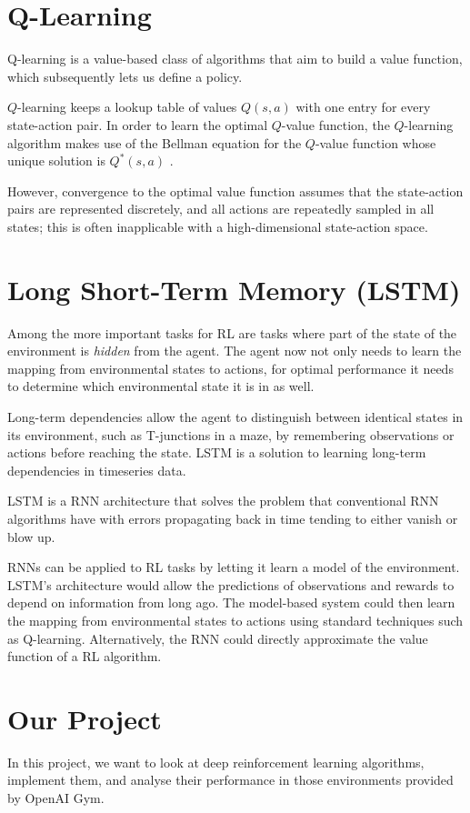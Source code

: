 \documentclass{article}
\begin{document}
\section{Q-Learning}
Q-learning is a value-based class of algorithms that aim to build a value function, which subsequently lets us define a policy.

$Q$-learning keeps a lookup table of values $Q(s,a)$ with one entry for every state-action pair. In order to learn the optimal $Q$-value function, the $Q$-learning algorithm makes use of the Bellman equation for the $Q$-value function whose unique solution is $Q^*(s,a)$ \cite{DBLP:journals/corr/abs-1811-12560}.

However, convergence to the optimal value function assumes that the state-action pairs are represented discretely, and all actions are repeatedly sampled in all states; this is often inapplicable with a high-dimensional state-action space.

\section{Long Short-Term Memory (LSTM) \cite{10.5555/2980539.2980731}}

Among the more important tasks for RL are tasks where part of the state of the environment is \textit{hidden} from the agent. The agent now not only needs to learn the mapping from environmental states to actions, for optimal performance it needs to determine which environmental state it is in as well.

Long-term dependencies allow the agent to distinguish between identical states in its environment, such as T-junctions in a maze, by remembering observations or actions before reaching the state. LSTM is a solution to learning long-term dependencies in timeseries data.

LSTM is a RNN architecture that solves the problem that conventional RNN algorithms have with errors propagating back in time tending to either vanish or blow up.

RNNs can be applied to RL tasks by letting it learn a model of the environment. LSTM's architecture would allow the predictions of observations and rewards to depend on information from long ago. The model-based system could then learn the mapping from environmental states to actions using standard techniques such as Q-learning. Alternatively, the RNN could directly approximate the value function of a RL algorithm.

\section{Our Project}

In this project, we want to look at deep reinforcement learning algorithms, implement them, and analyse their performance in those environments provided by OpenAI Gym.

\printbibliography
\end{document}
